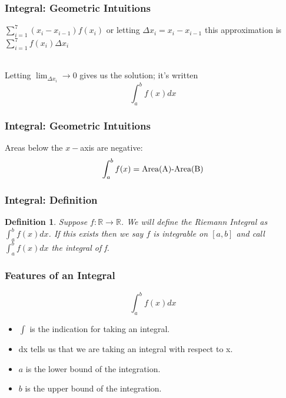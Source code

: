 \documentclass[handout]{beamer}
\newtheorem{defn}{Definition}
\numberwithin{equation}{section}
\begin{document}
\begin{frame}
\frametitle{Integral: Geometric Intuitions}

\begin{center}
\end{center}
  
$\sum_{i=1}^7 (x_i-x_{i-1})f(x_i)$  or letting $\Delta x_i=x_i-x_{i-1}$ this approximation is
$\sum_{i=1}^7 f(x_i) \Delta x_i$ \pause

\ \\Letting $\lim_{\Delta x_i}\rightarrow 0$ gives us the solution; it's written $$\int_a^b f(x) dx$$

\end{frame}



\begin{frame}
\frametitle{Integral: Geometric Intuitions}

Areas below the $x-$axis are negative: $$\int_a^b f(x)=\hbox{Area(A)-Area(B)}$$
  
\begin{center}
\end{center}

\end{frame}



\begin{frame}
\frametitle{Integral: Definition}

\begin{defn} Suppose $f:\mathbb{R} \rightarrow \mathbb{R}$.  We will define the Riemann Integral as $\int_{a}^{b} f(x) dx$.  If this exists then we say $f$ is \alert{integrable} on $[a,b]$ and call $\int_{a}^{b} f(x) dx$ the \alert{integral} of f.  
\end{defn}

\end{frame}



\begin{frame}
\frametitle{Features of an Integral}

$$\int_{a}^{b} f(x) dx$$

\begin{itemize} 
\item $\int$ is the indication for taking an integral.
\item dx tells us that we are taking an integral with respect to x.
\item $a$ is the lower bound of the integration.
\item $b$ is the upper bound of the integration.
\end{itemize}

\end{frame}
\end{document}
